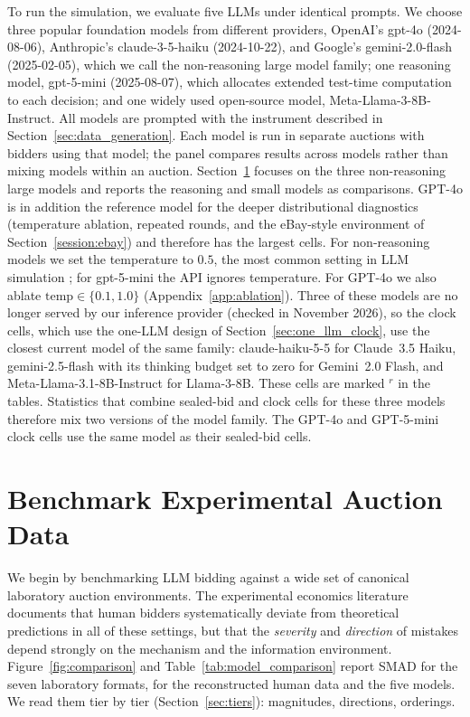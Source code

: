 \documentclass[acmsmall,screen,review]{acmart}
\newcommand{\rev}[1]{{\color{blue}#1}}
\newcommand{\rev}[1]{#1}
\begin{document}
To run the simulation, we evaluate five LLMs under identical prompts. We choose three popular foundation models from different providers, OpenAI's gpt-4o (2024-08-06), Anthropic's claude-3-5-haiku (2024-10-22), and Google's gemini-2.0-flash (2025-02-05), which we call the non-reasoning large model family; one reasoning model, gpt-5-mini (2025-08-07), which allocates extended test-time computation to each decision; and one widely used open-source model, Meta-Llama-3-8B-Instruct. All models are prompted with the instrument described in Section~\ref{sec:data_generation}. Each model is run in separate auctions with bidders using that model; the panel compares results across models rather than mixing models within an auction. Section~\ref{sec:benchmark_experimental} focuses on the three non-reasoning large models and reports the reasoning and small models as comparisons. GPT-4o is in addition the reference model for the deeper distributional diagnostics (temperature ablation, repeated rounds, and the eBay-style environment of Section~\ref{session:ebay}) and therefore has the largest cells. For non-reasoning models we set the temperature to $0.5$, the most common setting in LLM simulation \citep{horton2023large, Horton2024EDSL}; for gpt-5-mini the API ignores temperature. For GPT-4o we also ablate $\text{temp}\in\{0.1, 1.0\}$ (Appendix~\ref{app:ablation}). \rev{Three of these models are no longer served by our inference provider (checked in November 2026), so the clock cells, which use the one-LLM design of Section~\ref{sec:one_llm_clock}, use the closest current model of the same family: claude-haiku-5-5 for Claude~3.5 Haiku, gemini-2.5-flash with its thinking budget set to zero for Gemini~2.0 Flash, and Meta-Llama-3.1-8B-Instruct for Llama-3-8B. These cells are marked $^{r}$ in the tables. Statistics that combine sealed-bid and clock cells for these three models therefore mix two versions of the model family. The GPT-4o and GPT-5-mini clock cells use the same model as their sealed-bid cells.}

\section{Benchmark Experimental Auction Data}\label{sec:benchmark_experimental}

We begin by benchmarking LLM bidding against a wide set of canonical laboratory auction environments. The experimental economics literature documents that human bidders systematically deviate from theoretical predictions in all of these settings, but that the \emph{severity} and \emph{direction} of mistakes depend strongly on the mechanism and the information environment. Figure~\ref{fig:comparison} and Table~\ref{tab:model_comparison} report SMAD for the seven laboratory formats, for the reconstructed human data and the five models. We read them tier by tier (Section~\ref{sec:tiers}): magnitudes, directions, orderings.
\end{document}
